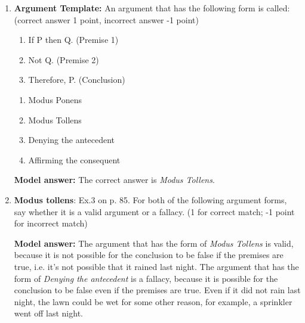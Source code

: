 \documentclass[a4,11pt]{article}
\newcommand{\6}{\mbox{$[\hspace*{-.6mm}[$}}
\newcommand{\9}{\mbox{$]\hspace*{-.6mm}]$}}
\begin{document}
\begin{enumerate}[leftmargin = 12pt]
\begin{enumerate}[noitemsep]
\item $K \wedge S$
\item $K \vee A$
\item $K \wedge \neg S$
\item $\neg K \wedge A$
\item $\neg (K \vee A)$
\end{enumerate}

{\bf Model answer:} The English sentences in (a) - (e) are translated by the Propositional logic formulae in (a) - (e), respectively (i.e., in the order given).


\item {\bf Argument Template:} An argument that has the following form is called: (correct answer 1 point, incorrect answer -1 point)

\begin{enumerate}[noitemsep]
\item[] If P then Q.  \hfill (Premise 1)
\item[] Not Q.  \hfill  (Premise 2)
\item[] Therefore, P. \hfill  (Conclusion)
\end{enumerate}

\begin{enumerate}[noitemsep]
\item Modus Ponens
\item Modus Tollens
\item Denying the antecedent
\item Affirming the consequent
\end{enumerate}

{\bf Model answer:} The correct answer is \textit{Modus Tollens}.

\item {\bf Modus tollens}: Ex.3 on p. 85. For both of the following argument forms, say whether it is a valid argument or a fallacy.  (1 for correct match; -1 point for incorrect match)

{\bf Model answer:} The argument that has the form of {\it Modus Tollens} is valid, because it is not possible for the conclusion to be false if the premises are true, i.e. it's not possible that it rained last night. The argument that has the form of {\it Denying the antecedent} is a fallacy, because it is possible for the conclusion to be false even if the premises are true. Even if it did not rain last night, the lawn could be wet for some other reason, for example, a sprinkler went off last night.



\end{enumerate}
\end{document}

